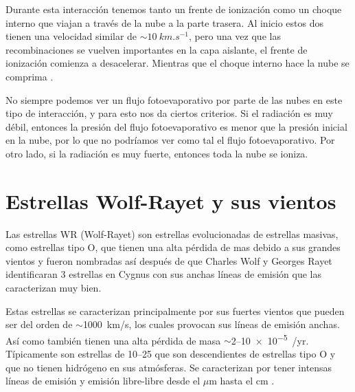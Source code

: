 \documentclass{book}
\begin{document}
Durante esta interacción tenemos tanto un frente de ionización como un choque interno que viajan a través de la nube a la parte trasera. Al inicio estos dos tienen una velocidad similar de $\sim\SI{10}{km.s^{-1}}$, pero una vez que las recombinaciones se vuelven importantes en la capa aislante, el frente de ionización comienza a desacelerar. Mientras que el choque interno hace la nube se comprima \citep{Bertoldi_1989}.

No siempre podemos ver un flujo fotoevaporativo por parte de las nubes en este tipo de interacción, y para esto \cite{Kahn:1954} nos da ciertos criterios. Si el radiación es muy débil, entonces la presión del flujo fotoevaporativo es menor que la presión inicial en la nube, por lo que no podríamos ver como tal el flujo fotoevaporativo. Por otro lado, si la radiación es muy fuerte, entonces toda la nube se ioniza.


\section{Estrellas Wolf-Rayet y sus vientos}

Las estrellas WR (Wolf-Rayet) son estrellas evolucionadas de estrellas masivas, como estrellas tipo O, que tienen una alta pérdida de mas debido a sus grandes vientos y fueron nombradas así después de que Charles Wolf y Georges Rayet identificaran 3 estrellas en Cygnus con sus  anchas líneas de emisión que las caracterizan muy bien. 

Estas estrellas se caracterizan principalmente por sus fuertes vientos que pueden ser del orden de $\sim$\SI{1000}{km/s}, los cuales provocan sus líneas de emisión anchas. Así como también tienen una alta pérdida de masa $\sim$2--\SI{10e-5}{\msun/yr}. Típicamente son estrellas de 10--\SI{25}{\msun} que son descendientes de estrellas tipo O y que no tienen hidrógeno en sus atmósferas. Se caracterizan por tener intensas líneas de emisión y emisión libre-libre desde el $\mu$m hasta el cm \citep{crowther:2007}.
\end{document}
